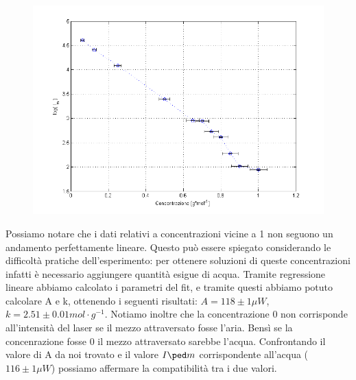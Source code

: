 \documentclass[a4paper,11pt]{article}
\begin{document}
 \begin{center} 
\begin{figure}[htpd]
\hspace{0 pt}
\includegraphics[scale=0.80]{grafico1.png}


\end{figure}
\end{center}
\vspace{7 cm}
Possiamo notare che i dati relativi a concentrazioni vicine a 1 non seguono un andamento perfettamente lineare. Questo può essere spiegato considerando le difficoltà pratiche dell'esperimento: per ottenere soluzioni di queste concentrazioni infatti è necessario aggiungere quantità esigue di acqua. Tramite regressione lineare abbiamo calcolato i parametri del fit, e tramite questi abbiamo potuto calcolare A e k, ottenendo i seguenti risultati: $A = 118  \pm 1 \mu W $,$k = 2.51 \pm 0.01 mol\cdot g^{-1}$. Notiamo inoltre che la concentrazione 0 non corrisponde all'intensità del laser se il mezzo attraversato fosse l'aria. Bensì se la concenrazione fosse 0 il mezzo attraversato sarebbe l'acqua. Confrontando il valore di A da noi trovato e il valore $I\ped m$ corrispondente all'acqua ($116  \pm 1 \mu W $) possiamo affermare la compatibilità tra i due valori.   
\end{document}
